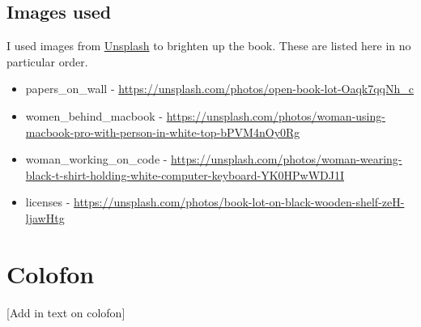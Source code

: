 \documentclass[
]{book}
\providecommand{\tightlist}{%
  \setlength{\itemsep}{0pt}\setlength{\parskip}{0pt}}
\begin{document}
\hypertarget{images-used}{%
\section{Images used}\label{images-used}}

I used images from \href{https://unsplash.com/s/photos/legal}{Unsplash} to brighten up the book. These are listed here in no particular order.

\begin{itemize}
\tightlist
\item
  papers\_on\_wall - \url{https://unsplash.com/photos/open-book-lot-Oaqk7qqNh_c}
\item
  women\_behind\_macbook - \url{https://unsplash.com/photos/woman-using-macbook-pro-with-person-in-white-top-bPVM4nOy0Rg}
\item
  woman\_working\_on\_code - \url{https://unsplash.com/photos/woman-wearing-black-t-shirt-holding-white-computer-keyboard-YK0HPwWDJ1I}
\item
  licenses - \url{https://unsplash.com/photos/book-lot-on-black-wooden-shelf-zeH-ljawHtg}
\end{itemize}

\hypertarget{colofon}{%
\chapter{Colofon}\label{colofon}}

{[}Add in text on colofon{]}

  
\end{document}

